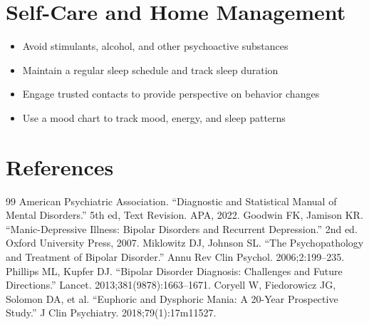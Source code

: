 \section*{Self-Care and Home Management}
\begin{itemize}
  \item Avoid stimulants, alcohol, and other psychoactive substances
  \item Maintain a regular sleep schedule and track sleep duration
  \item Engage trusted contacts to provide perspective on behavior changes
  \item Use a mood chart to track mood, energy, and sleep patterns
\end{itemize}

\section*{References}
\begin{thebibliography}{99}
 American Psychiatric Association. ``Diagnostic and Statistical Manual of Mental Disorders.'' 5th ed, Text Revision. APA, 2022.
 Goodwin FK, Jamison KR. ``Manic-Depressive Illness: Bipolar Disorders and Recurrent Depression.'' 2nd ed. Oxford University Press, 2007.
 Miklowitz DJ, Johnson SL. ``The Psychopathology and Treatment of Bipolar Disorder.'' Annu Rev Clin Psychol. 2006;2:199--235.
 Phillips ML, Kupfer DJ. ``Bipolar Disorder Diagnosis: Challenges and Future Directions.'' Lancet. 2013;381(9878):1663--1671.
 Coryell W, Fiedorowicz JG, Solomon DA, et al. ``Euphoric and Dysphoric Mania: A 20-Year Prospective Study.'' J Clin Psychiatry. 2018;79(1):17m11527.
\end{thebibliography}
